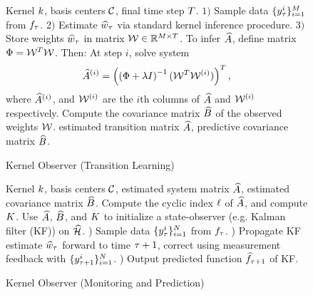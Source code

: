 \begin{figure}[t!]
	\centering
	\begin{algorithm}[H]
		\caption{Kernel Observer (Transition Learning)}
		\label{alg:egp_trans}
		\begin{algorithmic}
				 Kernel $k$, basis centers $\mathcal{C}$, final time 
				step $T$. 
				\WHILE{$\tindex \leq \ftime$}
				\STATE $1)$ Sample data $\{y^i_{\tau}\}_{i=1}^{M}$ from $f_{\tau}$. 
				\STATE $2)$ Estimate $\widehat{w}_\tau$ via standard kernel inference procedure. 
				\STATE $3)$ Store weights $\widehat{w}_\tau$ in matrix $\mathcal{W}\in\mathbb{R}^{M\times T}$.
				\ENDWHILE
				\STATE To infer $\widehat{A}$, define matrix $\Phi = \mathcal{W}^T\mathcal{W}$. Then:
				\STATE At step $i$, solve system
				\begin{align}
				\widehat{A}^{(i)} = \left(\left(\Phi + \lambda I\right)^{-1}(\mathcal{W}^T\mathcal{W}^{(i)})\right)^T,
				\end{align}
				where $\widehat{A}^{(i)}$, and $\mathcal{W}^{(i)}$ are the $i$th columns of $\widehat{A}$ and $\mathcal{W}^{(i)}$ respectively. 
				\ENDFOR
				\STATE Compute the covariance matrix  $\widehat{B}$ of the observed 
				weights $\mathcal{W}$. 
				 estimated transition matrix $\widehat{A}$, predictive covariance    
				matrix $\widehat{B}$. 
		\end{algorithmic}
	\end{algorithm}
	\vspace{-0.3in}
\end{figure}
\begin{figure}[t!]
	\begin{algorithm}[H]
		\caption{Kernel Observer (Monitoring and Prediction)}
		\label{alg:egp_inf}
		\begin{algorithmic}
				 Kernel $k$, basis centers $\mathcal{C}$, 
				estimated system matrix $\widehat{A}$, estimated covariance matrix $\widehat{B}$.
				 Compute the cyclic index $\ell$ of $\widehat{A}$, and compute $K$.
				 Use $\widehat{A}$, $\widehat{B}$, and $K$ to initialize a state-observer (e.g. Kalman filter (KF)) on $\widehat{\mathcal{H}}$.
				\WHILE{ measurements available }   
				) Sample data $\{y^i_{\tau}\}_{i=1}^{N}$ from $f_{\tau}$.
				) Propagate KF estimate $\widehat{w}_{\tau}$ 
				forward to time $\tau+1$, correct using measurement feedback with $\{y^i_{\tau+1}\}_{i=1}^{N}$. 
				) Output predicted function $\widehat{f}_{\tau+1}$ of KF.
				\ENDWHILE   
		\end{algorithmic}
	\end{algorithm}
	\vspace{-0.2in}
\end{figure}
